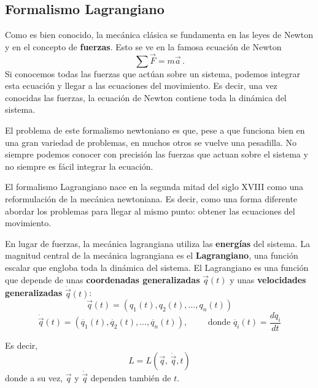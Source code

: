     \subsection{Formalismo Lagrangiano}

    Como es bien conocido, la mecánica clásica se fundamenta en las leyes de Newton y en el concepto de \textbf{fuerzas}. Esto se ve en la famosa ecuación de Newton
    \begin{equation}
        \sum \vec{F} = m \vec{a} \,.
    \end{equation}
    Si conocemos todas las fuerzas que actúan sobre un sistema, podemos integrar esta ecuación y llegar a las ecuaciones del movimiento. Es decir, una vez conocidas las fuerzas, la ecuación de Newton contiene toda la dinámica del sistema.

    El problema de este formalismo newtoniano es que, pese a que funciona bien en una gran variedad de problemas, en muchos otros se vuelve una pesadilla. No siempre podemos conocer con precisión las fuerzas que actuan sobre el sistema y no siempre es fácil integrar la ecuación.

    El formalismo Lagrangiano nace en la segunda mitad del siglo XVIII como una reformulación de la mecánica newtoniana. Es decir, como una forma diferente abordar los problemas para llegar al mismo punto: obtener las ecuaciones del movimiento. 

    En lugar de fuerzas, la mecánica lagrangiana utiliza las \textbf{energías} del sistema. La magnitud central de la mecánica lagrangiana es el \textbf{Lagrangiano}, una función escalar que engloba toda la dinámica del sistema. El Lagrangiano es una función que depende de unas \textbf{coordenadas generalizadas} $\vec{q}(t)$ y unas \textbf{velocidades generalizadas} $\dot{\vec{q}}(t)$:
    \begin{equation}
        \vec{q}(t) = (q_1(t), q_2(t), \dots, q_n(t))
    \end{equation}
    \begin{equation}
        \dot{\vec{q}}(t) = (\dot{q_1}(t), \dot{q_2}(t), \dots, \dot{q_n}(t)), \qquad \text{ donde } \dot{q_i}(t) = \frac{d q_i}{dt}
    \end{equation}

    Es decir, 
    \begin{equation}
        L= L(\vec{q},\,  \dot{\vec{q}}, t) 
    \end{equation}
    donde a su vez, $\vec{q}$ y $\dot{\vec{q}}$ dependen también de $t$.
    
